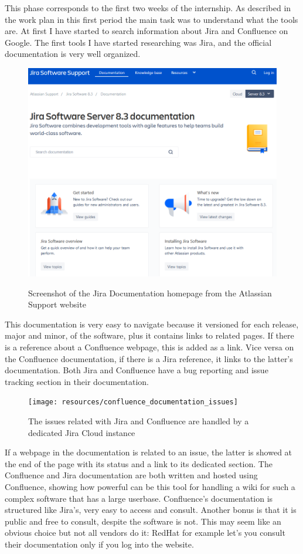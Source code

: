 	This phase corresponds to the first two weeks of the internship.
	As described in the work plan in this first period the main task was to understand what the tools are.
	At first I have started to search information about Jira and Confluence on Google.
	The first tools I have started researching was Jira, and the official documentation is very well organized.
	\begin{figure}[H]
		\centering
		\includegraphics[width=1\textwidth]{resources/jira_documentation}\\
		\caption{Screenshot of the Jira Documentation homepage from the Atlassian Support website}
	\end{figure}
	This documentation is very easy to navigate because it versioned for each release, major and minor, of the software, plus it contains links to related pages.	
	If there is a reference about a Confluence webpage, this is added as a link.
	Vice versa on the Confluence documentation, if there is a Jira reference, it links to the latter's documentation.	
	Both Jira and Confluence have a bug reporting and issue tracking section in their documentation.
	\begin{figure}[H]
		\centering
		\texttt{[image: resources/confluence\_documentation\_issues]}\\
		\caption{The issues related with Jira and Confluence are handled by a dedicated Jira Cloud instance}
	\end{figure}
	If a webpage in the documentation is related to an issue, the latter is showed at the end of the page with its status and a link to its dedicated section. %
	The Confluence and Jira documentation are both written and hosted using Confluence, showing how powerful can be this tool for handling a wiki for such a complex software that has a large userbase.
	Confluence's documentation is structured like Jira's, very easy to access and consult.	
	Another bonus is that it is public and free to consult, despite the software is not.
	This may seem like an obvious choice but not all vendors do it: RedHat for example let's you consult their documentation only if you log into the website.
	
